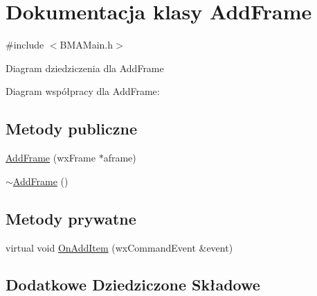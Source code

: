 \hypertarget{class_add_frame}{\section{Dokumentacja klasy Add\+Frame}
\label{class_add_frame}
}


{\ttfamily \#include $<$B\+M\+A\+Main.\+h$>$}



Diagram dziedziczenia dla Add\+Frame


Diagram współpracy dla Add\+Frame\+:
\subsection*{Metody publiczne}
\begin{DoxyCompactItemize}
\item 
\hyperlink{class_add_frame_aa283cf74b21f6a6bfd49ca57fd75d297}{Add\+Frame} (wx\+Frame $\ast$aframe)
\item 
\hyperlink{class_add_frame_aebed4c4d8e322603a4ddbbf7e247d7fb}{$\sim$\+Add\+Frame} ()
\end{DoxyCompactItemize}
\subsection*{Metody prywatne}
\begin{DoxyCompactItemize}
\item 
virtual void \hyperlink{class_add_frame_aa389d695347d4b576e0f962a58b6038c}{On\+Add\+Item} (wx\+Command\+Event \&event)
\end{DoxyCompactItemize}
\subsection*{Dodatkowe Dziedziczone Składowe}


